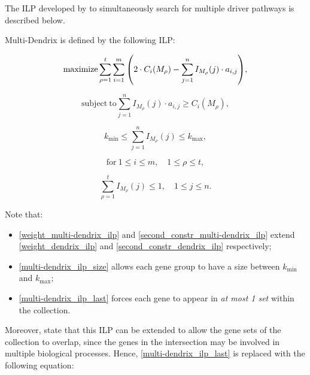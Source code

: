 The ILP developed by \textcite{multi-dendrix} to simultaneously search for multiple driver pathways is described below.

\begin{definition}
    Multi-Dendrix is defined by the following ILP:

    \begin{equation} \label{weight_multi-dendrix_ilp}
        \mathrm{maximize} \sum_{\rho = 1}^t {\sum_{i = 1}^m {\left(2 \cdot C_i(M_\rho) - \sum_{j = 1}^n I_{M_\rho}(j) \cdot a_{i, j}\right)}},
    \end{equation}

    \begin{equation} \label{second_constr_multi-dendrix_ilp}
        \mathrm{subject \ to} \sum_{j = 1}^n I_{M_\rho}(j) \cdot {a_{i, j}} \ge C_i(M_\rho),
    \end{equation}

    \begin{equation} \label{multi-dendrix_ilp_size}
        k_\mathrm{min} \le \sum_{j = 1}^n {I_{M_\rho}(j)} \le k_\mathrm{max},
    \end{equation}
    
    \begin{equation*}
        \mathrm{for\ } 1 \le i \le m, \quad 1 \le \rho \le t,
    \end{equation*}

    \begin{equation} \label{multi-dendrix_ilp_last}
        \sum_{\rho = 1}^t{I_{M_\rho}(j)} \le 1, \quad 1 \le j \le n.
    \end{equation}
\end{definition}

Note that:

\begin{itemize}
    \item \cref{weight_multi-dendrix_ilp} and \cref{second_constr_multi-dendrix_ilp} extend \cref{weight_dendrix_ilp} and \cref{second_constr_dendrix_ilp} respectively;
    \item \cref{multi-dendrix_ilp_size} allows each gene group to have a size between $k_\mathrm{min}$ and $k_\mathrm{max}$;
    \item \cref{multi-dendrix_ilp_last} forces each gene to appear in \textit{at most 1 set} within the collection. 
\end{itemize}

Moreover, \textcite{multi-dendrix} state that this ILP can be extended to allow the gene sets of the collection to overlap, since the genes in the intersection may be involved in multiple biological processes. Hence, \cref{multi-dendrix_ilp_last} is replaced with the following equation:

